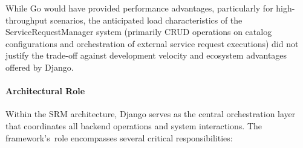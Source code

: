 While Go would have provided performance advantages, particularly for high-throughput scenarios, the anticipated load characteristics of the ServiceRequestManager system (primarily CRUD operations on catalog configurations and orchestration of external service request executions) did not justify the trade-off against development velocity and ecosystem advantages offered by Django.

\paragraph{Architectural Role}

Within the SRM architecture, Django serves as the central orchestration layer that coordinates all backend operations and system interactions. The framework's~role encompasses several critical responsibilities:

